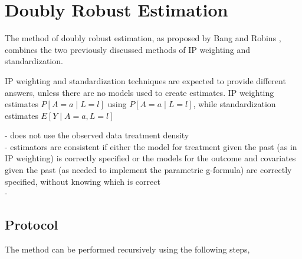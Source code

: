 

\section{Doubly Robust Estimation} 
The method of doubly robust estimation, as proposed by Bang and Robins \cite{bang2005doubly}, combines the two previously discussed methods of IP weighting and standardization.  

IP weighting and standardization techniques are expected to provide different answers, unless there are no models used to create estimates.\cite{hernan_robins_2016}  
IP weighting estimates $P[A=a \mid L =l]$ using $P[A =a \mid L= l]$, while standardization estimates $E[Y \mid A = a, L=l]$  

- does not use the observed data treatment density \\
- estimators are consistent if either the model for treatment given the past (as in IP weighting) is correctly specified or the models for the outcome and covariates given the past (as needed to implement the parametric g-formula) are correctly specified, without knowing which is correct\\
- 

\subsection{Protocol} 
The method can be performed recursively using the following steps, 

